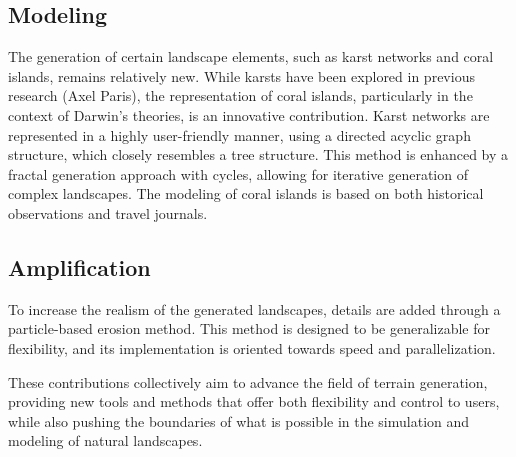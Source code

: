 \subsection{Modeling}
The generation of certain landscape elements, such as karst networks and coral islands, remains relatively new. While karsts have been explored in previous research (Axel Paris), the representation of coral islands, particularly in the context of Darwin's theories, is an innovative contribution. Karst networks are represented in a highly user-friendly manner, using a directed acyclic graph structure, which closely resembles a tree structure. This method is enhanced by a fractal generation approach with cycles, allowing for iterative generation of complex landscapes. The modeling of coral islands is based on both historical observations and travel journals.

\subsection{Amplification}
To increase the realism of the generated landscapes, details are added through a particle-based erosion method. This method is designed to be generalizable for flexibility, and its implementation is oriented towards speed and parallelization. 

These contributions collectively aim to advance the field of terrain generation, providing new tools and methods that offer both flexibility and control to users, while also pushing the boundaries of what is possible in the simulation and modeling of natural landscapes.







